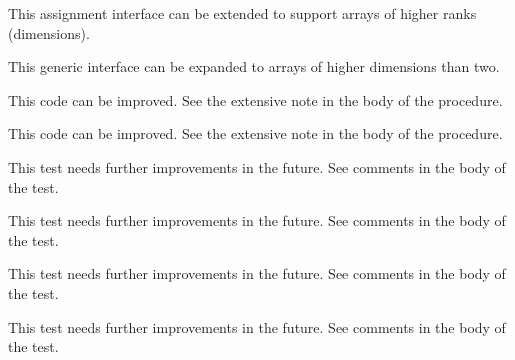 \begin{DoxyRefList}
%
 This assignment interface can be extended to support arrays of higher ranks (dimensions). 
\item[Type \mbox{\hyperlink{interfaceString__mod_1_1val2char}{String\+\_\+mod\+::val2char}} ]\label{todo__todo000057}%
%
 This generic interface can be expanded to arrays of higher dimensions than two. 
\item[Subprogram \mbox{\hyperlink{namespaceSystem__mod_a8f999de90840ba33f9cf7f30edd41b3d}{System\+\_\+mod\+::copy\+File}} (path\+Old, path\+New, is\+Unix\+Shell, Err)]\label{todo__todo000060}%
%
 This code can be improved. See the extensive note in the body of the procedure.  
\item[Subprogram \mbox{\hyperlink{namespaceSystem__mod_acdbe0231b40135bc08ab285fc69f2b80}{System\+\_\+mod\+::get\+System\+Info}} (List, Err, OS, count, cache\+File)]\label{todo__todo000059}%
%
 This code can be improved. See the extensive note in the body of the procedure.  
\item[Subprogram \mbox{\hyperlink{namespaceTest__System__mod_a56a58918b2888e7ea0fa691de93cdeb3}{Test\+\_\+\+System\+\_\+mod\+::test\+\_\+\+Cmd\+Arg\+\_\+type\+\_\+1}} ()]\label{todo__todo000067}%
%
 This test needs further improvements in the future. See comments in the body of the test.  
\item[Subprogram \mbox{\hyperlink{namespaceTest__System__mod_a43fd8159ffe52170057e95d4e0c38d63}{Test\+\_\+\+System\+\_\+mod\+::test\+\_\+\+Env\+Var\+\_\+type\+\_\+1}} ()]\label{todo__todo000064}%
%
 This test needs further improvements in the future. See comments in the body of the test.  
\item[Subprogram \mbox{\hyperlink{namespaceTest__System__mod_ab0121f340538dae91c97cc5cdcba0a7b}{Test\+\_\+\+System\+\_\+mod\+::test\+\_\+\+Env\+Var\+\_\+type\+\_\+2}} ()]\label{todo__todo000065}%
%
 This test needs further improvements in the future. See comments in the body of the test.  
\item[Subprogram \mbox{\hyperlink{namespaceTest__System__mod_a26054fb4e3bf2d05710adc7965bc8431}{Test\+\_\+\+System\+\_\+mod\+::test\+\_\+\+Env\+Var\+\_\+type\+\_\+3}} ()]\label{todo__todo000066}%
%
 This test needs further improvements in the future. See comments in the body of the test.  
\item[Subprogram \mbox{\hyperlink{namespaceTest__System__mod_a8d37f80583c104a3dfb6b99a897feb26}{Test\+\_\+\+System\+\_\+mod\+::test\+\_\+execute\+Cmd\+\_\+1}} ()]\label{todo__todo000072}%

\end{DoxyRefList}
